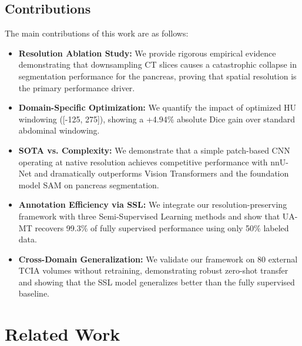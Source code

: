 \documentclass[review,authoryear]{elsarticle}
\begin{document}
\subsection{Contributions}
The main contributions of this work are as follows:
\begin{itemize}
    \item \textbf{Resolution Ablation Study:} We provide rigorous empirical evidence demonstrating that downsampling CT slices causes a catastrophic collapse in segmentation performance for the pancreas, proving that spatial resolution is the primary performance driver.
    \item \textbf{Domain-Specific Optimization:} We quantify the impact of optimized HU windowing ([-125, 275]), showing a +4.94\% absolute Dice gain over standard abdominal windowing.
    \item \textbf{SOTA vs. Complexity:} We demonstrate that a simple patch-based CNN operating at native resolution achieves competitive performance with nnU-Net and dramatically outperforms Vision Transformers and the foundation model SAM on pancreas segmentation.
    \item \textbf{Annotation Efficiency via SSL:} We integrate our resolution-preserving framework with three Semi-Supervised Learning methods and show that UA-MT recovers 99.3\% of fully supervised performance using only 50\% labeled data.
    \item \textbf{Cross-Domain Generalization:} We validate our framework on 80 external TCIA volumes without retraining, demonstrating robust zero-shot transfer and showing that the SSL model generalizes better than the fully supervised baseline.
\end{itemize}

\section{Related Work}
\end{document}
